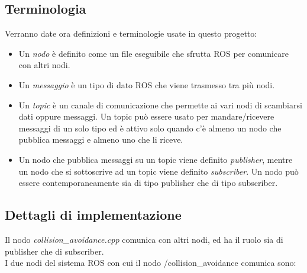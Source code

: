 \subsection{Terminologia}
Verranno date ora definizioni e terminologie usate in questo progetto:\\
\begin{itemize}
	\item Un \textit{nodo} è definito come un file eseguibile che sfrutta ROS per comunicare con altri nodi.
	\item Un \textit{messaggio} è un tipo di dato ROS che viene trasmesso tra più nodi.
	\item Un \textit{topic} è un canale di comunicazione che permette ai vari nodi di scambiarsi dati oppure messaggi. Un topic può essere usato per mandare/ricevere messaggi di un solo tipo ed è attivo solo quando c’è almeno un nodo che pubblica messaggi e almeno uno che li riceve. 
	\item Un nodo che pubblica messaggi su un topic viene definito \textit{publisher}, mentre un nodo che si sottoscrive ad un topic viene definito \textit{subscriber}. Un nodo può essere contemporaneamente sia di tipo publisher che di tipo subscriber.
\end{itemize}

\subsection{Dettagli di implementazione}
Il nodo \textit{collision\_avoidance.cpp} comunica con altri nodi, ed ha il ruolo sia di publisher che di subscriber.\\
I due nodi del sistema ROS con cui il nodo /collision\_avoidance comunica sono:

